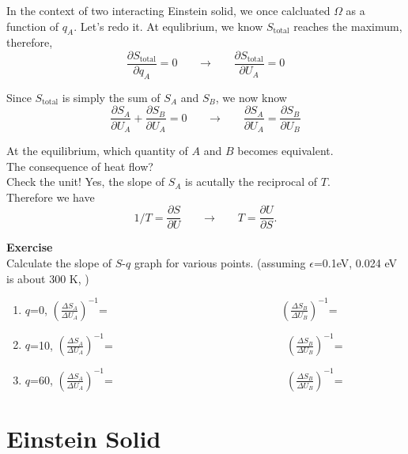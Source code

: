 \documentclass[twoside]{article}
\begin{document}
In the context of two interacting Einstein solid, we once calcluated $\Omega$ as a function of $q_A$. Let's redo it.
At equlibrium, we know $S_\text{total}$ reaches the maximum, therefore,
\begin{equation} \label{entropy} 
\frac {\partial{S_\text{total}}} {\partial{q_A}}=0     ~~~~~~~~ \rightarrow~~~~~~~~  \frac {\partial{S_\text{total}}} {\partial{U_A}}=0
\end{equation}

Since $S_\text{total}$ is simply the sum of $S_A$ and $S_B$, we now know
\begin{equation} \label{entropy} 
\frac {\partial{S_A}} {\partial{U_A}} +  \frac {\partial{S_B}} {\partial{U_A}} =0     ~~~~~~~~ \rightarrow~~~~~~~~  
\frac {\partial{S_A}} {\partial{U_A}} =  \frac {\partial{S_B}} {\partial{U_B}} 
\end{equation}

At the equilibrium, which quantity of $A$ and $B$ becomes equivalent. \\
The consequence of heat flow?\\
Check the unit! Yes, the slope of $S_A$ is acutally the reciprocal of $T$.\\
Therefore we have
\begin{equation} 
1/T = \frac {\partial{S}} {\partial{U}} ~~~~~~~~ \rightarrow~~~~~~~~ T = \frac {\partial{U}} {\partial{S}}.
\end{equation}

{\bf Exercise}\\
Calculate the slope of $S$-$q$ graph for various points. (assuming $\epsilon$=0.1eV, 0.024 eV is about 300 K, )\\
\begin{enumerate}
\item $q$=0,  $(\frac {\Delta{S_A}} {\Delta{U_A}})^{-1}$=  ~~~~~~~~~~~~~~~~~~~~~~~~~~~~~~  $(\frac {\Delta{S_B}} {\Delta{U_B}})^{-1}$= 
\item $q$=10, $(\frac {\Delta{S_A}} {\Delta{U_A}})^{-1}$=  ~~~~~~~~~~~~~~~~~~~~~~~~~~~~~~  $(\frac {\Delta{S_B}} {\Delta{U_B}})^{-1}$= 
\item $q$=60, $(\frac {\Delta{S_A}} {\Delta{U_A}})^{-1}$=  ~~~~~~~~~~~~~~~~~~~~~~~~~~~~~~  $(\frac {\Delta{S_B}} {\Delta{U_B}})^{-1}$= 
\end{enumerate}

\section{Einstein Solid}
\end{document}

